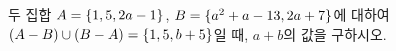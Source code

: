 두 집합 $A=\{1{,}\mkern3mu\mathopen{}5{,}\mkern3mu\mathopen{}2a-1\}$, $B=\{a^2+a-13{,}\mkern3mu\mathopen{}2a+7\}$에 대하여 $(A-B)\cup(B-A)=\{1{,}\mkern3mu\mathopen{}5{,}\mkern3mu\mathopen{}b+5\}$일 때, $a+b$의 값을 구하시오. 
